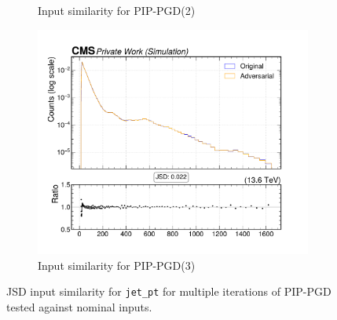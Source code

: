 \begin{figure}[htbp]
\begin{subfigure}[t]{0.32\textwidth}
    \caption*{Input similarity for PIP-PGD(2)}
  \end{subfigure}\hfill
  \begin{subfigure}[t]{0.32\textwidth}
    \includegraphics[width=\linewidth]{media/output/features/compare/combined_it_3/cmp_global_features_jet_pt.pdf}
    \caption*{Input similarity for PIP-PGD(3)}
  \end{subfigure}

  \caption*{JSD input similarity for \texttt{jet\_pt} for multiple iterations of PIP-PGD tested against nominal inputs.}
  \label{fig:combined_input_jet_pt}
\end{figure}

